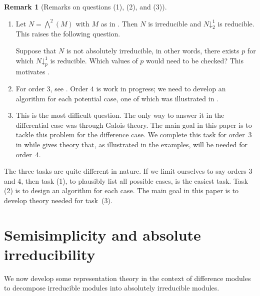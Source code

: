\documentclass[11pt,reqno]{amsart}
\theoremstyle{definition}
\newtheorem{remark}[theorem]{Remark}
\newcommand{\pda}{\mathord{\downarrow}}
\begin{document}
\begin{remark}[Remarks on questions (1), (2), and (3)]\hfill

\begin{enumerate}
\item Let $N=\bigwedge^2(M)$ with $M$ as in . Then $N$ is irreducible and $N \pda_{2}^{1}$ is reducible. This raises the following question.

Suppose that $N$ is not absolutely irreducible, in other words, there exists $p$ for which $N \pda_{p}^{1}$ is reducible. Which values of $p$ would need to be checked? This motivates .

\item For order $3$, see \cite{bou2024solving}. Order $4$ is work in progress; we need to develop an algorithm for each potential case, one of which was illustrated in .  %

\item This is the most difficult question. The only way to answer it in the differential case was through Galois theory. The main goal in this paper is to tackle this problem for the difference case. We complete this task for order~3 in  while  gives theory that, as illustrated in the examples, will be needed for order~4.
\end{enumerate}
The three tasks are quite different in nature.  If we limit ourselves to say orders 3 and 4, then task (1), to plausibly list all possible cases, is the easiest task.
%
Task (2) is to design an algorithm for each case.
The main goal in this paper is to develop theory needed for task~(3).
\end{remark}


\section{Semisimplicity and absolute irreducibility}
\label{section:semisimplicity}
We now develop some representation theory in the context of difference modules to decompose irreducible modules into absolutely irreducible modules.
\end{document}
